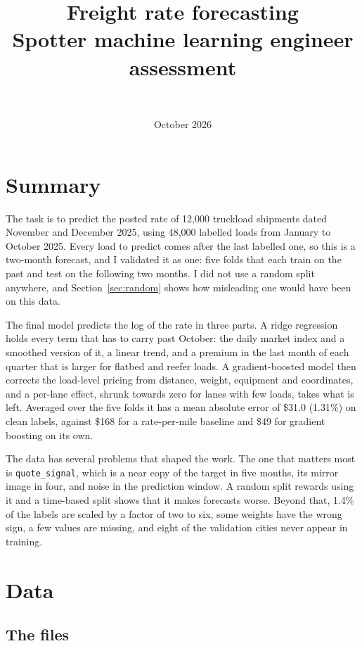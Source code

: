 \documentclass[11pt]{article}
\title{\textbf{Freight rate forecasting}\\[2pt]\large Spotter machine learning engineer assessment}
\author{\authorname\\\small\authoremail}
\date{October 2026}
\newcommand{\code}[1]{\texttt{#1}}
\begin{document}
\maketitle

\section{Summary}

The task is to predict the posted rate of 12,000 truckload shipments dated November and
December 2025, using 48,000 labelled loads from January to October 2025. Every load to
predict comes after the last labelled one, so this is a two-month forecast, and I
validated it as one: five folds that each train on the past and test on the following two
months. I did not use a random split anywhere, and Section~\ref{sec:random} shows how
misleading one would have been on this data.

The final model predicts the log of the rate in three parts. A ridge regression holds
every term that has to carry past October: the daily market index and a smoothed version
of it, a linear trend, and a premium in the last month of each quarter that is larger for
flatbed and reefer loads. A gradient-boosted model then corrects the load-level pricing
from distance, weight, equipment and coordinates, and a per-lane effect, shrunk towards
zero for lanes with few loads, takes what is left. Averaged over the five folds it has a
mean absolute error of \$31.0 (1.31\%) on clean labels, against \$168 for a rate-per-mile
baseline and \$49 for gradient boosting on its own.

The data has several problems that shaped the work. The one that matters most is
\code{quote\_signal}, which is a near copy of the target in five months, its mirror image
in four, and noise in the prediction window. A random split rewards using it and a
time-based split shows that it makes forecasts worse. Beyond that, 1.4\% of the labels are
scaled by a factor of two to six, some weights have the wrong sign, a few values are
missing, and eight of the validation cities never appear in training.

\section{Data}

\subsection{The files}
\end{document}
